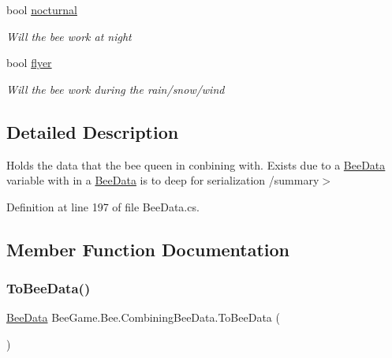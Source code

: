 \begin{DoxyCompactItemize}
bool \hyperlink{struct_bee_game_1_1_bee_1_1_combining_bee_data_a337800df462a764c58328d21d2398d6c}{nocturnal}
\begin{DoxyCompactList}\small\item\em Will the bee work at night \end{DoxyCompactList}\item 
bool \hyperlink{struct_bee_game_1_1_bee_1_1_combining_bee_data_ac0af7556cf90035ff830a6e121e8d4c4}{flyer}
\begin{DoxyCompactList}\small\item\em Will the bee work during the rain/snow/wind \end{DoxyCompactList}\end{DoxyCompactItemize}


\subsection{Detailed Description}
Holds the data that the bee queen in conbining with. Exists due to a \hyperlink{struct_bee_game_1_1_bee_1_1_bee_data}{Bee\+Data} variable with in a \hyperlink{struct_bee_game_1_1_bee_1_1_bee_data}{Bee\+Data} is to deep for serialization /summary$>$ 

Definition at line 197 of file Bee\+Data.\+cs.



\subsection{Member Function Documentation}
\mbox{\label{struct_bee_game_1_1_bee_1_1_combining_bee_data_a8f49452b4800bbc401a225e2676eeca0}} 
\subsubsection{\texorpdfstring{To\+Bee\+Data()}{ToBeeData()}}
{\footnotesize\ttfamily \hyperlink{struct_bee_game_1_1_bee_1_1_bee_data}{Bee\+Data} Bee\+Game.\+Bee.\+Combining\+Bee\+Data.\+To\+Bee\+Data (\begin{DoxyParamCaption}{ }\end{DoxyParamCaption})}



